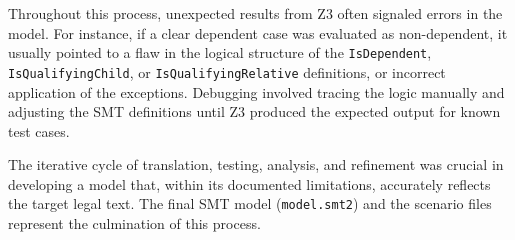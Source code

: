 \documentclass[11pt, letterpaper]{article}
\begin{document}
Throughout this process, unexpected results from Z3 often signaled errors in the model. For instance, if a clear dependent case was evaluated as non-dependent, it usually pointed to a flaw in the logical structure of the \texttt{IsDependent}, \texttt{IsQualifyingChild}, or \texttt{IsQualifyingRelative} definitions, or incorrect application of the exceptions. Debugging involved tracing the logic manually and adjusting the SMT definitions until Z3 produced the expected output for known test cases.

The iterative cycle of translation, testing, analysis, and refinement was crucial in developing a model that, within its documented limitations, accurately reflects the target legal text. The final SMT model (\texttt{model.smt2}) and the scenario files represent the culmination of this process.
\end{document}
